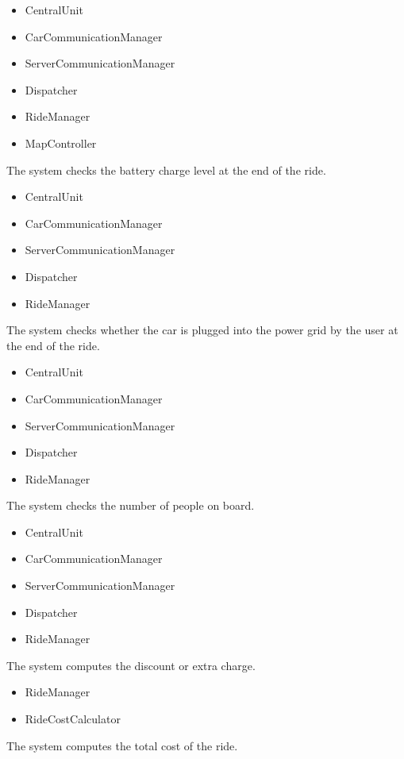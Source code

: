 \documentclass[11pt,a4paper]{report}
\begin{document}
\begin{Req}
			\begin{itemize}
				\item CentralUnit
				\item CarCommunicationManager
				\item ServerCommunicationManager
				\item Dispatcher
				\item RideManager
				\item MapController
			\end{itemize}
		\item The system checks the battery charge level at the end of the ride.
			\begin{itemize}
				\item CentralUnit
				\item CarCommunicationManager
				\item ServerCommunicationManager
				\item Dispatcher
				\item RideManager
			\end{itemize}
		\item The system checks whether the car is plugged into the power grid by the user at the end of the ride.
			\begin{itemize}
				\item CentralUnit
				\item CarCommunicationManager
				\item ServerCommunicationManager
				\item Dispatcher
				\item RideManager
			\end{itemize}
		\item The system checks the number of people on board.
				\begin{itemize}
				\item CentralUnit
				\item CarCommunicationManager
				\item ServerCommunicationManager
				\item Dispatcher
				\item RideManager
			\end{itemize}
		\item The system computes the discount or extra charge.
			\begin{itemize}
				\item RideManager
				\item RideCostCalculator
			\end{itemize}
		\item The system computes the total cost of the ride.

\end{Req}
\end{document}
